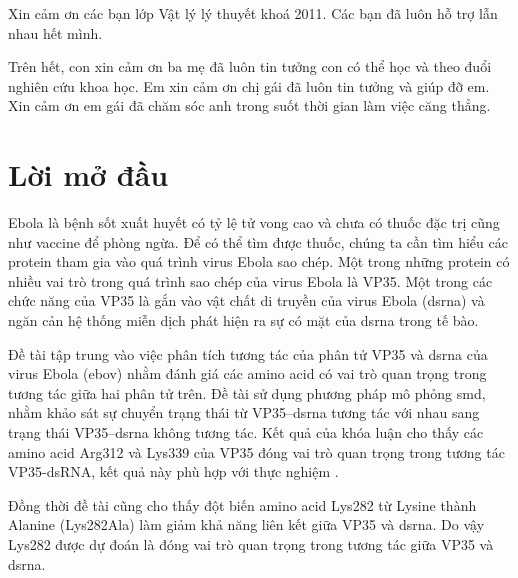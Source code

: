 \documentclass[12pt,a4paper,reqno, oneside]{book}
\begin{document}
Xin cảm ơn các bạn lớp Vật lý lý thuyết khoá 2011. Các bạn đã luôn hỗ trợ lẫn nhau hết mình.

Trên hết, con xin cảm ơn ba mẹ đã luôn tin tưởng con có thể học và theo đuổi nghiên cứu khoa học. Em xin cảm ơn chị gái đã luôn tin tưởng và giúp đỡ em. Xin cảm ơn em gái đã chăm sóc anh trong suốt thời gian làm việc căng thẳng.

\printglossaries
{}
\clearpage

\newpage
\pagestyle{fancy}
\listoffigures




\newpage
{}
\chapter*{Lời mở đầu}
	Ebola là bệnh sốt xuất huyết có tỷ lệ tử vong cao và chưa có thuốc đặc trị cũng như vaccine để phòng ngừa. Để có thể tìm được thuốc, chúng ta cần tìm hiểu các protein tham gia vào quá trình virus Ebola sao chép. Một trong những protein có nhiều vai trò trong quá trình sao chép của virus Ebola là VP35. Một trong các chức năng của VP35 là gắn vào vật chất di truyền của virus Ebola (\gls{dsrna}) và ngăn cản hệ thống miễn dịch phát hiện ra sự có mặt của \gls{dsrna} trong tế bào.
	
	Đề tài tập trung vào việc phân tích tương tác của phân tử VP35 và \gls{dsrna} của virus Ebola (\gls{ebov}) nhằm đánh giá các amino acid có vai trò quan trọng trong tương tác giữa hai phân tử trên. Đề tài sử dụng phương pháp mô phỏng \gls{smd}, nhằm khảo sát sự chuyển trạng thái từ VP35--\gls{dsrna} tương tác với nhau sang trạng thái VP35--\gls{dsrna} không tương tác. Kết quả của khóa luận cho thấy các amino acid Arg312 và Lys339 của VP35 đóng vai trò quan trọng trong tương tác VP35-dsRNA, kết quả này phù hợp với thực nghiệm \cite{Leung2010}.
	
	Đồng thời đề tài cũng cho thấy đột biến amino acid Lys282 từ Lysine thành Alanine (Lys282Ala) làm giảm khả năng liên kết giữa VP35 và \gls{dsrna}. Do vậy Lys282 được dự đoán là đóng vai trò quan trọng trong tương tác giữa VP35 và \gls{dsrna}.
	
	
\end{document}
